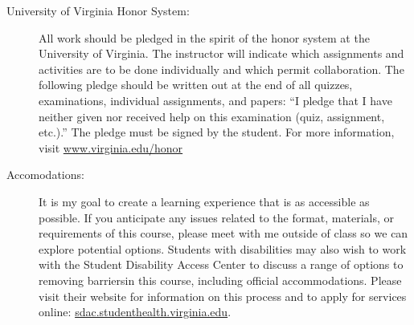 \documentclass[11pt]{article}
\begin{document}
\begin{description}
\item[University of Virginia Honor System:]  

All work should be pledged in the spirit of the honor system at the University of Virginia. The instructor will indicate which assignments and activities are to be done individually and which permit collaboration. The following pledge should be written out at the end of all quizzes, examinations, individual assignments, and papers: “I pledge that I have neither given nor received help on this examination (quiz, assignment, etc.).” The pledge must be signed by the student. For more information, visit \url{www.virginia.edu/honor}

\item[Accomodations:]  

It is my goal to create a learning experience that is as accessible as possible. If you anticipate any issues related to the format, materials, or requirements of this course, please meet with me outside of class so we can explore potential options. Students with disabilities may also wish to work with the Student Disability Access Center to discuss a range of options to removing barriersin this course, including official accommodations. Please visit their website for information on this process and to apply for services online: \url{sdac.studenthealth.virginia.edu}. 

\end{description}
\end{document}
